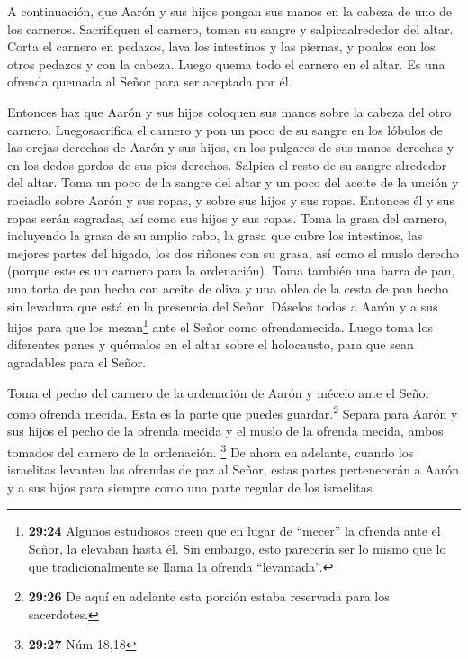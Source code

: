  A continuación, que Aarón y sus hijos pongan sus manos
en la cabeza de uno de los carneros.  Sacrifiquen el
carnero, tomen su sangre y salpicaalrededor del altar. 
Corta el carnero en pedazos, lava los intestinos y las piernas, y ponlos
con los otros pedazos y con la cabeza.  Luego quema todo
el carnero en el altar. Es una ofrenda quemada al Señor para ser
aceptada por él.

 Entonces haz que Aarón y sus hijos coloquen sus manos
sobre la cabeza del otro carnero.  Luegosacrifica el
carnero y pon un poco de su sangre en los lóbulos de las orejas derechas
de Aarón y sus hijos, en los pulgares de sus manos derechas y en los
dedos gordos de sus pies derechos. Salpica el resto de su sangre
alrededor del altar.  Toma un poco de la sangre del altar
y un poco del aceite de la unción y rociadlo sobre Aarón y sus ropas, y
sobre sus hijos y sus ropas. Entonces él y sus ropas serán sagradas, así
como sus hijos y sus ropas.  Toma la grasa del carnero,
incluyendo la grasa de su amplio rabo, la grasa que cubre los
intestinos, las mejores partes del hígado, los dos riñones con su grasa,
así como el muslo derecho (porque este es un carnero para la
ordenación).  Toma también una barra de pan, una torta de
pan hecha con aceite de oliva y una oblea de la cesta de pan hecho sin
levadura que está en la presencia del Señor.  Dáselos
todos a Aarón y a sus hijos para que los mezan\footnote{\textbf{29:24}
  Algunos estudiosos creen que en lugar de ``mecer'' la ofrenda ante el
  Señor, la elevaban hasta él. Sin embargo, esto parecería ser lo mismo
  que lo que tradicionalmente se llama la ofrenda ``levantada''.} ante
el Señor como ofrendamecida.  Luego toma los diferentes
panes y quémalos en el altar sobre el holocausto, para que sean
agradables para el Señor.

 Toma el pecho del carnero de la ordenación de Aarón y
mécelo ante el Señor como ofrenda mecida. Esta es la parte que puedes
guardar.\footnote{\textbf{29:26} De aquí en adelante esta porción estaba
  reservada para los sacerdotes.}  Separa para Aarón y
sus hijos el pecho de la ofrenda mecida y el muslo de la ofrenda mecida,
ambos tomados del carnero de la ordenación. \footnote{\textbf{29:27} Núm
  18,18}  De ahora en adelante, cuando los israelitas
levanten las ofrendas de paz al Señor, estas partes pertenecerán a Aarón
y a sus hijos para siempre como una parte regular de los israelitas.

